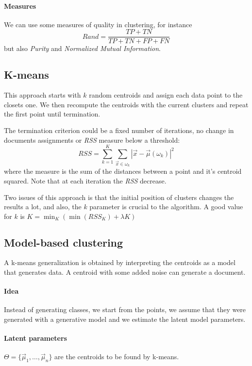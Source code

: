 \paragraph{Measures}
We can use some measures of quality in clustering, 
for instance 
$$\mathit{Rand} = \frac{\mathit{TP} + \mathit{TN}}{\mathit{TP} + \mathit{TN} + \mathit{FP} + \mathit{FN}}$$
but also \emph{Purity} and \emph{Normalized Mutual Information}.

\subsection{K-means}
This approach starts with $k$ random centroids and assign each data point 
to the closets one. We then recompute the centroids with the current clusters 
and repeat the first point until termination.

The termination criterion could be a fixed number of iterations, no change 
in documents assignments or \emph{RSS} measure below a threshold:
$$\mathit{RSS} = \sum_{k=1}^K\sum_{\vec{x} \in \omega_k}|\vec{x} - \vec{\mu}(\omega_k)|^2$$
where the measure is the sum of the distances between a point and it's centroid squared.
Note that at each iteration the \emph{RSS} decrease.

Two issues of this approach is that the initial position of clusters
changes the results a lot, and also, the $k$ parameter is crucial to the 
algorithm.
A good value for $k$ is $K = \min_K(\min(\mathit{RSS}_K) + \lambda K )$

\subsection{Model-based clustering}
A k-means generalization is obtained by interpreting the centroids as a model 
that generates data. A centroid with some added noise can generate a document.

\paragraph{Idea}
Instead of generating classes, we start from the points, 
we assume that they were generated with a generative model 
and we estimate the latent model parameters.

\paragraph{Latent parameters}
$\Theta = \{ \vec{\mu}_1, \dots, \vec{\mu}_n\}$ are the centroids 
to be found by k-means.


